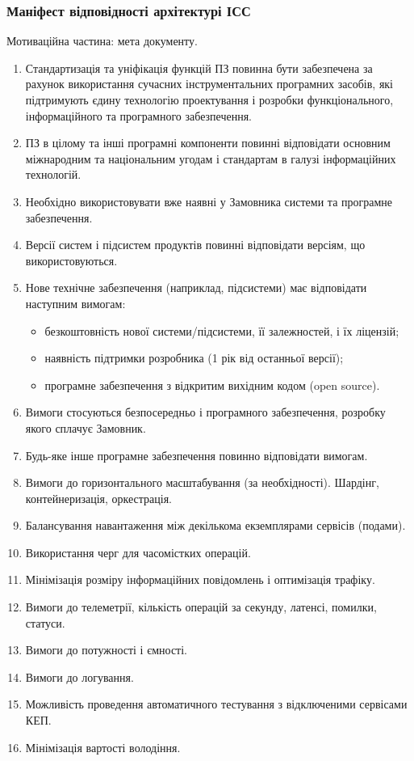 \documentclass{article}
\begin{document}
\newpage
\subsubsection{Маніфест відповідності архітектурі ІСС}

Мотиваційна частина: мета документу.

\begin{enumerate}
  \item Стандартизація та уніфікація функцій ПЗ повинна бути забезпечена за рахунок використання сучасних інструментальних програмних засобів, які підтримують єдину технологію проектування і розробки функціонального, інформаційного та програмного забезпечення.
  \item ПЗ в цілому та інші програмні компоненти повинні відповідати основним міжнародним та національним угодам і стандартам в галузі інформаційних технологій.
  \item Необхідно використовувати вже наявні у Замовника системи та програмне забезпечення.
  \item Версії систем і підсистем продуктів повинні відповідати версіям, що використовуються.
  \item Нове технічне забезпечення (наприклад, підсистеми) має відповідати наступним вимогам:
    \begin{itemize}
      \item безкоштовність нової системи/підсистеми, її залежностей, і їх ліцензій;
      \item наявність підтримки розробника (1 рік від останньої версії);
      \item програмне забезпечення з відкритим вихідним кодом (open source).
    \end{itemize}
  \item Вимоги стосуються безпосередньо і програмного забезпечення, розробку якого сплачує Замовник.
  \item Будь-яке інше програмне забезпечення повинно відповідати вимогам.
  \item Вимоги до горизонтального масштабування (за необхідності). Шардінг, контейнеризація, оркестрація.
  \item Балансування навантаження між декількома екземплярами сервісів (подами).
  \item Використання черг для часомістких операцій.
  \item Мінімізація розміру інформаційних повідомлень і оптимізація трафіку.
  \item Вимоги до телеметрії, кількість операцій за секунду, латенсі, помилки, статуси.
  \item Вимоги до потужності і ємності.
  \item Вимоги до логування.
  \item Можливість проведення автоматичного тестування з відключеними сервісами КЕП.
  \item Мінімізація вартості володіння.
\end{enumerate}
\end{document}
